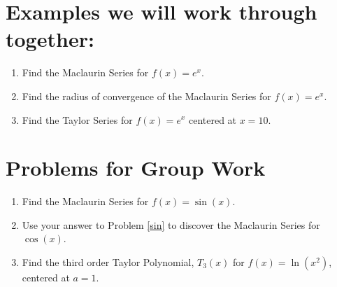 
\vfill

\section*{Examples we will work through together:}

\begin{enumerate}[{Example }1:]


\item Find the Maclaurin Series for \(f(x) = e^x\). \vfill
\item Find the radius of convergence of the Maclaurin Series for \(f(x) = e^x\). \vfill
\item Find the Taylor Series for \(f(x) = e^x\) centered at \(x=10\).\vfill


\end{enumerate}


\section*{Problems for Group Work}

\begin{enumerate}[{Problem }1:]
\item Find the Maclaurin Series for \(f(x) = \sin(x)\).\vfill \label{sin}
\item Use your answer to Problem \ref{sin} to discover the Maclaurin Series for \(\cos(x)\).\vfill
\item Find the third order Taylor Polynomial, \(T_3(x)\) for \(f(x) = \ln(x^2)\), centered at \(a=1\).\vfill


\end{enumerate}

